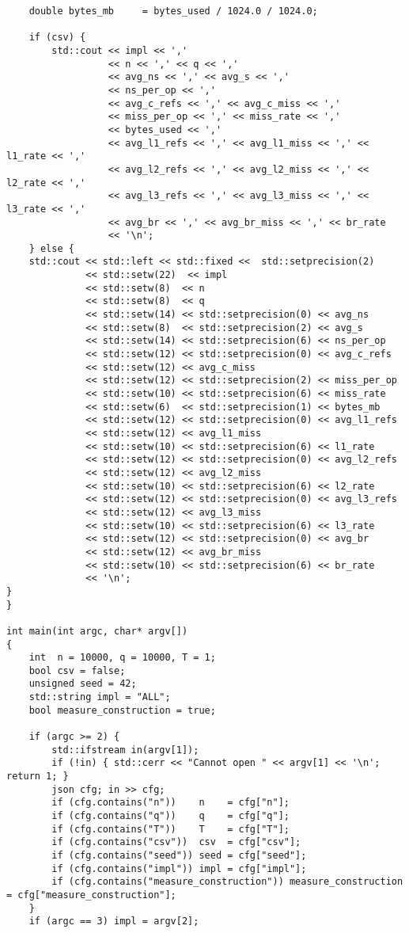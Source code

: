 \begin{lstlisting}
    double bytes_mb     = bytes_used / 1024.0 / 1024.0;

    if (csv) {
        std::cout << impl << ','
                  << n << ',' << q << ','
                  << avg_ns << ',' << avg_s << ','
                  << ns_per_op << ','
                  << avg_c_refs << ',' << avg_c_miss << ','
                  << miss_per_op << ',' << miss_rate << ','
                  << bytes_used << ','
                  << avg_l1_refs << ',' << avg_l1_miss << ',' << l1_rate << ','
                  << avg_l2_refs << ',' << avg_l2_miss << ',' << l2_rate << ','
                  << avg_l3_refs << ',' << avg_l3_miss << ',' << l3_rate << ','
                  << avg_br << ',' << avg_br_miss << ',' << br_rate
                  << '\n';
    } else {
    std::cout << std::left << std::fixed <<  std::setprecision(2)
              << std::setw(22)  << impl
              << std::setw(8)  << n
              << std::setw(8)  << q
              << std::setw(14) << std::setprecision(0) << avg_ns
              << std::setw(8)  << std::setprecision(2) << avg_s
              << std::setw(14) << std::setprecision(6) << ns_per_op
              << std::setw(12) << std::setprecision(0) << avg_c_refs
              << std::setw(12) << avg_c_miss
              << std::setw(12) << std::setprecision(2) << miss_per_op
              << std::setw(10) << std::setprecision(6) << miss_rate
              << std::setw(6)  << std::setprecision(1) << bytes_mb
              << std::setw(12) << std::setprecision(0) << avg_l1_refs
              << std::setw(12) << avg_l1_miss
              << std::setw(10) << std::setprecision(6) << l1_rate
              << std::setw(12) << std::setprecision(0) << avg_l2_refs
              << std::setw(12) << avg_l2_miss
              << std::setw(10) << std::setprecision(6) << l2_rate
              << std::setw(12) << std::setprecision(0) << avg_l3_refs
              << std::setw(12) << avg_l3_miss
              << std::setw(10) << std::setprecision(6) << l3_rate
              << std::setw(12) << std::setprecision(0) << avg_br
              << std::setw(12) << avg_br_miss
              << std::setw(10) << std::setprecision(6) << br_rate
              << '\n';
}
}

int main(int argc, char* argv[])
{
    int  n = 10000, q = 10000, T = 1;
    bool csv = false;
    unsigned seed = 42;
    std::string impl = "ALL";
    bool measure_construction = true;

    if (argc >= 2) {
        std::ifstream in(argv[1]);
        if (!in) { std::cerr << "Cannot open " << argv[1] << '\n'; return 1; }
        json cfg; in >> cfg;
        if (cfg.contains("n"))    n    = cfg["n"];
        if (cfg.contains("q"))    q    = cfg["q"];
        if (cfg.contains("T"))    T    = cfg["T"];
        if (cfg.contains("csv"))  csv  = cfg["csv"];
        if (cfg.contains("seed")) seed = cfg["seed"];
        if (cfg.contains("impl")) impl = cfg["impl"];
        if (cfg.contains("measure_construction")) measure_construction = cfg["measure_construction"];
    }
    if (argc == 3) impl = argv[2];


\end{lstlisting}
